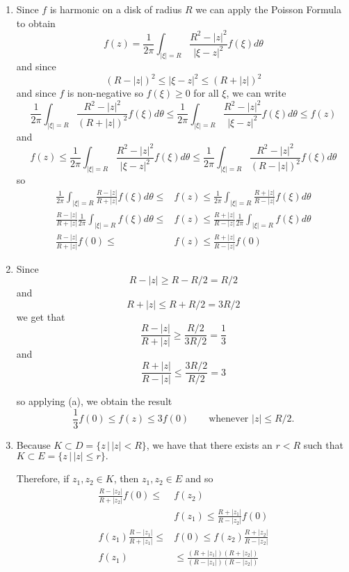 \documentclass[12pt]{Qual}
\begin{document}
\begin{solution}$\,$
\begin{enumerate}[label=(\alph*)]
    \item Since $f$ is harmonic on a disk of radius $R$ we can apply the Poisson Formula to obtain $$f(z)=\frac{1}{2\pi}\int_{|\xi|=R}\frac{R^2-|z|^2}{|\xi-z|^2}f(\xi)d\theta$$ and since $$(R-|z|)^2\le|\xi-z|^2\le(R+|z|)^2$$ and since $f$ is non-negative so $f(\xi)\ge0$ for all $\xi$, we can write $$ \frac{1}{2\pi}\int_{|\xi|=R}\frac{R^2-|z|^2}{(R+|z|)^2}f(\xi)d\theta\le \frac{1}{2\pi}\int_{|\xi|=R}\frac{R^2-|z|^2}{|\xi-z|^2}f(\xi)d\theta\le f(z)$$ and $$f(z)\le \frac{1}{2\pi}\int_{|\xi|=R}\frac{R^2-|z|^2}{|\xi-z|^2}f(\xi)d\theta\le \frac{1}{2\pi}\int_{|\xi|=R}\frac{R^2-|z|^2}{(R-|z|)^2}f(\xi)d\theta$$ so \begin{align*}
        \frac{1}{2\pi}\int_{|\xi|=R}\frac{R-|z|}{R+|z|}f(\xi)d\theta\le &f(z)\le  \frac{1}{2\pi}\int_{|\xi|=R}\frac{R+|z|}{R-|z|}f(\xi)d\theta\\
        \frac{R-|z|}{R+|z|}\frac{1}{2\pi}\int_{|\xi|=R}f(\xi)d\theta\le &f(z)\le \frac{R+|z|}{R-|z|}\frac{1}{2\pi}\int_{|\xi|=R}f(\xi)d\theta\\
        \frac{R-|z|}{R+|z|}f(0)\le &f(z)\le \frac{R+|z|}{R-|z|} f(0)
    \end{align*}
    \item Since $$R-|z|\ge R-R/2=R/2$$ and $$R+|z|\le R+R/2=3R/2$$ we get that $$\frac{R-|z|}{R+|z|}\ge \frac{R/2}{3R/2}=\frac{1}{3}$$ and $$\frac{R+|z|}{R-|z|}\le \frac{3R/2}{R/2}=3$$

    so applying (a), we obtain the result $$\frac{1}{3}f(0)\le f(z)\le 3f(0)\qquad\text{whenever }|z|\le R/2.$$
    \item Because $K\subset D=\{z\,|\,|z|<R\}$, we have that there exists an $r<R$ such that $K\subset E=\{z\,|\,  |z|\le r\}.$

    Therefore, if $z_1,z_2\in K$, then $z_1,z_2\in E$ and so \begin{align*}
        \frac{R-|z_2|}{R+|z_2|}f(0)\le & f(z_2)\\
        & f(z_1)\le \frac{R+|z_1|}{R-|z_2|}f(0)\\
       f(z_1)\frac{R-|z_1|}{R+|z_1|} \le &f(0)\le f(z_2)\frac{R+|z_2|}{R-|z_2|}\\
       f(z_1)&\le \frac{(R+|z_1|)(R+|z_2|)}{(R-|z_1|)(R-|z_2|)}
    \end{align*}
\end{enumerate}
\end{solution}
\newpage
\end{document}
